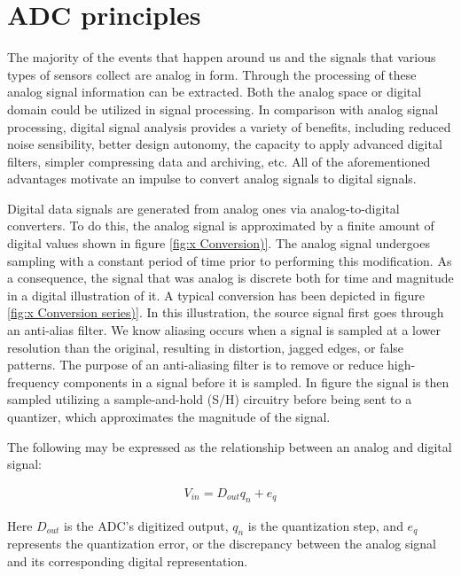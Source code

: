 \section{ADC principles} 
The majority of the events that happen around us and the signals that various types of sensors collect are analog in form. Through the processing of these analog signal information can be extracted. Both the analog space or digital domain could be utilized in signal processing. In comparison with analog signal processing, digital signal analysis provides a variety of benefits, including reduced noise sensibility, better design autonomy, the capacity to apply advanced digital filters, simpler compressing data and archiving, etc. All of the aforementioned advantages motivate an impulse to convert analog signals to digital signals. 
\vspace{1\baselineskip}\par 
Digital data signals are generated from analog ones via analog-to-digital converters. To do this, the analog signal is approximated by a finite amount of digital values shown in figure \ref{fig:x Conversion)}. The analog signal undergoes sampling with a constant period of time prior to performing this modification. As a consequence, the signal that was analog is discrete both for time and magnitude in a digital illustration of it. A typical conversion has been depicted in figure \ref{fig:x Conversion series)}. In this illustration, the source signal first goes through an anti-alias filter. We know aliasing occurs when a signal is sampled at a lower resolution than the original, resulting in distortion, jagged edges, or false patterns. The purpose of an anti-aliasing filter is to remove or reduce high-frequency components in a signal before it is sampled. In figure the signal is then sampled utilizing a sample-and-hold (S/H) circuitry before being sent to a quantizer, which approximates the magnitude of the signal.
\vspace{1\baselineskip}\par 
The following may be expressed as the relationship between an analog and digital signal:

\begin{align}
    V_{in} = D_{out}q_n + e_q
\end{align}

Here $D_{out}$ is the ADC's digitized output, $q_n$ is the quantization step, and $e_q$ represents the quantization error, or the discrepancy between the analog signal and its corresponding digital representation.


